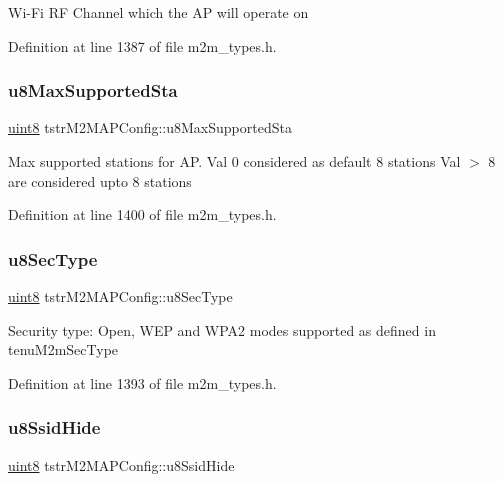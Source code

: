 Wi-\/\+Fi RF Channel which the AP will operate on 

Definition at line 1387 of file m2m\+\_\+types.\+h.

\mbox{\label{structtstrM2MAPConfig_af83f7b1e0f098c4ba68eb7c8914759f9}} 
\subsubsection{\texorpdfstring{u8\+Max\+Supported\+Sta}{u8MaxSupportedSta}}
{\footnotesize\ttfamily \hyperlink{group__DataT_ga4df709a77647e870bbf1d955b8edc9a6}{uint8} tstr\+M2\+M\+A\+P\+Config\+::u8\+Max\+Supported\+Sta}

Max supported stations for AP. Val 0 considered as default 8 stations Val $>$ 8 are considered upto 8 stations 

Definition at line 1400 of file m2m\+\_\+types.\+h.

\mbox{\label{structtstrM2MAPConfig_a08ec2faca4058e8627cbfdb20f6a6da5}} 
\subsubsection{\texorpdfstring{u8\+Sec\+Type}{u8SecType}}
{\footnotesize\ttfamily \hyperlink{group__DataT_ga4df709a77647e870bbf1d955b8edc9a6}{uint8} tstr\+M2\+M\+A\+P\+Config\+::u8\+Sec\+Type}

Security type\+: Open, W\+EP and W\+P\+A2 modes supported as defined in tenu\+M2m\+Sec\+Type 

Definition at line 1393 of file m2m\+\_\+types.\+h.

\mbox{\label{structtstrM2MAPConfig_a425c035bc96435d3a9e75082ce27b569}} 
\subsubsection{\texorpdfstring{u8\+Ssid\+Hide}{u8SsidHide}}
{\footnotesize\ttfamily \hyperlink{group__DataT_ga4df709a77647e870bbf1d955b8edc9a6}{uint8} tstr\+M2\+M\+A\+P\+Config\+::u8\+Ssid\+Hide}


